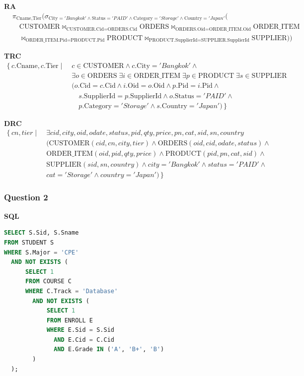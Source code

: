 \documentclass[a4paper,12pt]{article}
\begin{document}
\textbf{RA}
\[
\begin{aligned}
&\pi_{\text{Cname},\text{Tier}}\Big(
  \sigma_{\text{City}='Bangkok' \land \text{Status}='PAID' \land \text{Category}='Storage' \land \text{Country}='Japan'}\big(\\
&\quad \text{CUSTOMER}
  \bowtie_{\text{CUSTOMER.Cid}=\text{ORDERS.Cid}}
  \text{ORDERS}
  \bowtie_{\text{ORDERS.Oid}=\text{ORDER\_ITEM.Oid}}
  \text{ORDER\_ITEM}\\
&\quad \bowtie_{\text{ORDER\_ITEM.Pid}=\text{PRODUCT.Pid}}
  \text{PRODUCT}
  \bowtie_{\text{PRODUCT.SupplierId}=\text{SUPPLIER.SupplierId}}
  \text{SUPPLIER}
  \big)\Big)
\end{aligned}
\]

\textbf{TRC}
\[
\begin{aligned}
\{\, c.\text{Cname}, c.\text{Tier} \mid\;& c \in \text{CUSTOMER} \land c.\text{City}='Bangkok' \land\\
&\exists o \in \text{ORDERS}\;
\exists i \in \text{ORDER\_ITEM}\;
\exists p \in \text{PRODUCT}\;
\exists s \in \text{SUPPLIER}\\
&(o.\text{Cid}=c.\text{Cid} \land i.\text{Oid}=o.\text{Oid} \land p.\text{Pid}=i.\text{Pid} \land\\
&\quad s.\text{SupplierId}=p.\text{SupplierId} \land o.\text{Status}='PAID' \land\\
&\quad p.\text{Category}='Storage' \land s.\text{Country}='Japan') \,\}
\end{aligned}
\]

\textbf{DRC}
\[
\begin{aligned}
\{\, cn,tier \mid\;& \exists cid,city,oid,odate,status,pid,qty,price,pn,cat,sid,sn,country\\
&(\text{CUSTOMER}(cid,cn,city,tier) \land
\text{ORDERS}(oid,cid,odate,status) \land\\
&\text{ORDER\_ITEM}(oid,pid,qty,price) \land
\text{PRODUCT}(pid,pn,cat,sid) \land\\
&\text{SUPPLIER}(sid,sn,country) \land city='Bangkok' \land status='PAID' \land\\
&cat='Storage' \land country='Japan') \,\}
\end{aligned}
\]

\subsubsection*{Question 2}
\textbf{SQL}
\begin{lstlisting}[language=SQL]
SELECT S.Sid, S.Sname
FROM STUDENT S
WHERE S.Major = 'CPE'
  AND NOT EXISTS (
      SELECT 1
      FROM COURSE C
      WHERE C.Track = 'Database'
        AND NOT EXISTS (
            SELECT 1
            FROM ENROLL E
            WHERE E.Sid = S.Sid
              AND E.Cid = C.Cid
              AND E.Grade IN ('A', 'B+', 'B')
        )
  );
\end{lstlisting}
\end{document}
